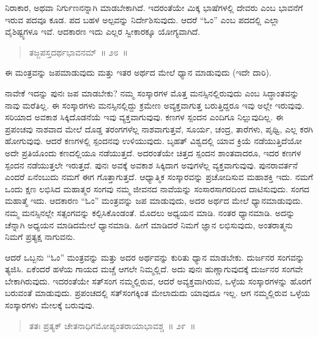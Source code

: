 ನಿರಾಕಾರ, ಅಥವಾ ನಿರ್ಗುಣನನ್ನಾಗಿ ಮಾಡಬೇಕಾಗಿದೆ. ಇದರಂತೆಯೇ ಮಿಕ್ಕ ಭಾಷೆಗಳಲ್ಲಿ ದೇವರು ಎಂಬ ಭಾವನೆಗೆ ಇರುವ ಪದವೂ ಕೂಡ. ಪದ ಬಹಳ ಅಲ್ಪವನ್ನು ನಿರ್ದೇಶಿಸುವುದು. ಆದರೆ “ಓಂ” ಎಂಬ ಪದದಲ್ಲಿ ಎಲ್ಲಾ ವೈಶಿಷ್ಟ್ಯಗಳೂ ಇವೆ. ಆದಕಾರಣ ಇದು ಎಲ್ಲರ ಸ್ವೀಕಾರಕ್ಕೂ ಯೋಗ್ಯವಾಗಿದೆ.

\eject

\begin{verse}
ತಜ್ಜಪಸ್ತದರ್ಥಭಾವನಮ್​~॥ ೨೮~॥
\end{verse}

\vspace{-0.3cm}

ಈ ಮಂತ್ರವನ್ನು ಜಪಮಾಡುವುದು ಮತ್ತು ಇತರ ಅರ್ಥದ ಮೇಲೆ ಧ್ಯಾನ ಮಾಡುವುದು (ಇದೇ ದಾರಿ). 

ನಾವೇಕೆ ಇದನ್ನು ಪುನಃ ಜಪ ಮಾಡಬೇಕು? ನಮ್ಮ ಸಂಸ್ಕಾರಗಳ ಮೊತ್ತ ಮನಸ್ಸಿನಲ್ಲಿರುವುದು ಎಂಬ ಸಿದ್ಧಾಂತವನ್ನು ನಾವು ಮರೆತಿಲ್ಲ. ಈ ಸಂಸ್ಕಾರಗಳು ಮನಸ್ಸಿನಲ್ಲಿದ್ದು ಕ್ರಮೇಣ ಅವ್ಯಕ್ತವಾಗುತ್ತ ಬರುತ್ತಿದ್ದರೂ ಇವು ಅಲ್ಲೇ ಇರುವುವು. ಸರಿಯಾದ ಅವಕಾಶ ಸಿಕ್ಕಿದೊಡನೆಯೆ ಇವು ವ್ಯಕ್ತವಾಗುವುವು. ಕಣಗಳ ಸ್ಪಂದನ ಎಂದಿಗೂ ನಿಲ್ಲುವುದಿಲ್ಲ. ಈ ಪ್ರಪಂಚವು ನಾಶವಾದ ಮೇಲೆ ದೊಡ್ಡ ತರಂಗಗಳೆಲ್ಲ ನಾಶವಾಗುತ್ತವೆ, ಸೂರ್ಯ, ಚಂದ್ರ, ತಾರೆಗಳು, ಪೃಥ್ವಿ, ಎಲ್ಲ ಕರಗಿ ಹೋಗುವುವು. ಆದರೆ ಕಣಗಳಲ್ಲಿ ಸ್ಪಂದನವು ಉಳಿಯುವುದು. ಬೃಹತ್​ ವಿಶ್ವದಲ್ಲಿ ಯಾವ ಕ್ರಿಯೆ ನಡೆಯುತ್ತಿದೆಯೋ ಅದೇ ಪ್ರತಿಯೊಂದು ಕಣದಲ್ಲಿಯೂ ನಡೆಯುತ್ತದೆ. ಅದರಂತೆಯೇ ಚಿತ್ತದ ಸ್ಪಂದನ ಶಾಂತವಾದರೂ, ಇದರ ಕಣಗಳ ಸ್ಪಂದನ ನಡೆಯುತ್ತಲೇ ಇರುತ್ತದೆ. ಪುನಃ ಅವಕ್ಕೆ ಅವಕಾಶ ಸಿಕ್ಕಿದಾಗ ಅವುಗಳೆಲ್ಲ ವ್ಯಕ್ತವಾಗುವುವು. ಪುನರಾವರ್ತನೆ ಎಂದರೆ ಏನೆಂಬುದು ನಮಗೆ ಈಗ ಗೊತ್ತಾಗುತ್ತದೆ. ಆಧ್ಯಾತ್ಮಿಕ ಸಂಸ್ಕಾರವನ್ನು ಪ್ರಚೋದಿಸುವ ಮಹಾಶಕ್ತಿ ಇದು. ನಮಗೆ ಒಂದು ಕ್ಷಣ ಲಭಿಸಿದ ಮಹಾತ್ಮರ ಸಂಗವು ನಮ್ಮ ಜೀವನದ ನಾವೆಯನ್ನು ಸಂಸಾರಸಾಗರದಿಂದ ದಾಟಿಸುವುದು. ಸಂಗದ ಮಹಾತ್ಮೆ ಇದು. ಆದಕಾರಣ “ಓಂ” ಮಂತ್ರವನ್ನು ಜಪ ಮಾಡುವುದು, ಅದರ ಅರ್ಥದ ಮೇಲೆ ಧ್ಯಾನಮಾಡುವುದು. ನಮ್ಮ ಮನಸ್ಸಿನಲ್ಲೇ ಸತ್ಸಂಗವನ್ನು ಕಲ್ಪಿಸಿಕೊಂಡಂತೆ. ಮೊದಲು ಅಧ್ಯಯನ ಮಾಡಿ. ನಂತರ ಧ್ಯಾನಮಾಡಿ. ಅದನ್ನು ಚೆನ್ನಾಗಿ ಅಧ್ಯಯನ ಮಾಡಿದಮೇಲೆ ಧ್ಯಾನಮಾಡಿ. ಹೀಗೆ ಮಾಡಿದರೆ ನಿಮಗೆ ಜ್ಞಾನ ಲಭಿಸುವುದು, ಅಂತರಾತ್ಮನು ನಿಮಗೆ ಪ್ರತ್ಯಕ್ಷ ನಾಗುವನು. 

ಆದರೆ ಒಬ್ಬನು “ಓಂ” ಮಂತ್ರವನ್ನು ಮತ್ತು ಅದರ ಅರ್ಥವನ್ನು ಕುರಿತು ಧ್ಯಾನ ಮಾಡಬೇಕು. ದುರ್ಜನರ ಸಂಗವನ್ನು ತ್ಯಜಿಸಿ. ಏಕೆಂದರೆ ಹಳೆಯ ಗಾಯದ ಮಚ್ಚೆ ಆಗಲೇ ನಿಮ್ಮಲ್ಲಿದೆ. ಅದು ಪುನಃ ಹುಣ್ಣಾಗುವುದಕ್ಕೆ ದುರ್ಜನರ ಸಂಗವೇ ಬೇಕಾಗಿರುವುದು. ಇದರಂತೆಯೇ ಸತ್​ಸಂಗ ನಮ್ಮಲ್ಲಿರುವ, ಆದರೆ ಅವ್ಯಕ್ತವಾಗಿರುವ, ಒಳ್ಳೆಯ ಸಂಸ್ಕಾರಗಳನ್ನು ಹೊರಗೆ ಬರುವಂತೆ ಮಾಡುವುದು. ಪ್ರಪಂಚದಲ್ಲಿ ಸತ್​ಸಂಗಕ್ಕಿಂತ ಮೇಲಾದುದು ಯಾವುದೂ ಇಲ್ಲ. ಆಗ ನಮ್ಮಲ್ಲಿರುವ ಒಳ್ಳೆಯ ಸಂಸ್ಕಾರಗಳು ಮೇಲಕ್ಕೆ ಬರುವುವು. 


\begin{verse}
ತತಃ ಪ್ರತ್ಯಕ್​ ಚೇತನಾಧಿಗಮೋಪ್ಯಂತರಾಯಾಭಾವಶ್ಚ~॥ ೨೯~॥
\end{verse}


